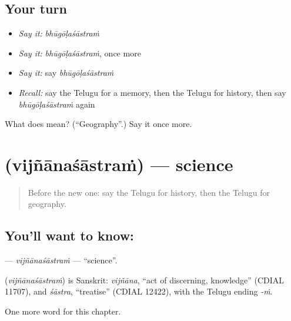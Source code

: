 \subsection*{Your turn}
\begin{itemize}
\raggedright
  \item \emph{Say it:} \emph{bhūgōḷaśāstraṁ}
  \item \emph{Say it:} \emph{bhūgōḷaśāstraṁ}, once more
  \item \emph{Say it:} say \emph{bhūgōḷaśāstraṁ}
  \item \emph{Recall:} say the Telugu for a memory, then the Telugu for history, then say \emph{bhūgōḷaśāstraṁ} again
\end{itemize}

\begin{tcolorbox}[breakable,colback=teal!4,colframe=teal!35!black,title={Before you move on}]
What does  mean? (\textquotedblleft{}Geography\textquotedblright{}.) Say it once more.
\end{tcolorbox}
\section[\texorpdfstring{\te{విజ్ఞానశాస్త్రం} (vijñānaśāstraṁ)}{విజ్ఞానశాస్త్రం (vijñānaśāstraṁ)}]{ (vijñānaśāstraṁ) — science}

\label{lesson:TE-C238-vijnanasastram}



\begin{quote}
Before the new one: say the Telugu for history, then the Telugu for geography.
\end{quote}

\subsection*{You'll want to know: }
\textbf{} — \emph{vijñānaśāstraṁ} — \textquotedblleft{}science\textquotedblright{}.

\begin{cousinweb}
\textbf{} (\emph{vijñānaśāstraṁ}) is Sanskrit: \emph{vijñāna}, \textquotedblleft{}act of discerning, knowledge\textquotedblright{} (CDIAL 11707), and \emph{śāstra}, \textquotedblleft{}treatise\textquotedblright{} (CDIAL 12422), with the Telugu ending \emph{-ṁ}.
\end{cousinweb}

\begin{grammarlens}[title={What you've built}]
One more word for this chapter.
\end{grammarlens}

